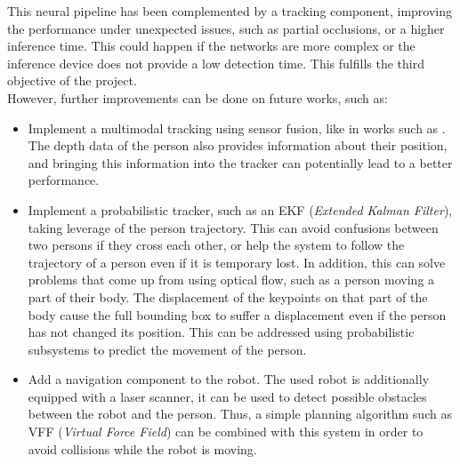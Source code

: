 This neural pipeline has been complemented by a tracking component, improving the performance under unexpected issues, such as partial occlusions, or a higher inference time. This could happen if the networks are more complex or the inference device does not provide a low detection time. This fulfills the third objective of the project.\\

However, further improvements can be done on future works, such as:

\begin{itemize}
	\item Implement a multimodal tracking using sensor fusion, like in works such as \cite{rgbd_tracking}. The depth data of the person also provides information about their position, and bringing this information into the tracker can potentially lead to a better performance.
	
	\item Implement a probabilistic tracker, such as an EKF (\textit{Extended Kalman Filter}), taking leverage of the person trajectory. This can avoid confusions between two persons if they cross each other, or help the system to follow the trajectory of a person even if it is temporary lost. In addition, this can solve problems that come up from using optical flow, such as a person moving a part of their body. The displacement of the keypoints on that part of the body cause the full bounding box to suffer a displacement even if the person has not changed its position. This can be addressed using probabilistic subsystems to predict the movement of the person.
		
	\item Add a navigation component to the robot. The used robot is additionally equipped with a laser scanner, it can be used to detect possible obstacles between the robot and the person. Thus, a simple planning algorithm such as VFF (\textit{Virtual Force Field}) can be combined with this system in order to avoid collisions while the robot is moving.
\end{itemize}







